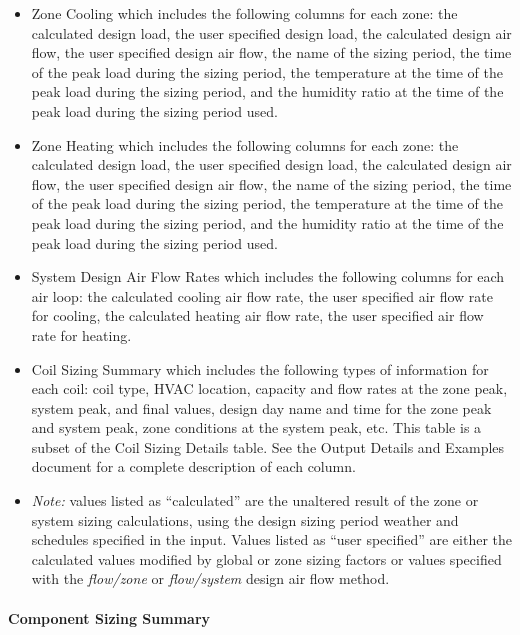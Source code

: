 \begin{itemize}
\item
  Zone Cooling which includes the following columns for each zone: the calculated design load, the user specified design load, the calculated design air flow, the user specified design air flow, the name of the sizing period, the time of the peak load during the sizing period, the temperature at the time of the peak load during the sizing period, and the humidity ratio at the time of the peak load during the sizing period used.
\item
  Zone Heating which includes the following columns for each zone: the calculated design load, the user specified design load, the calculated design air flow, the user specified design air flow, the name of the sizing period, the time of the peak load during the sizing period, the temperature at the time of the peak load during the sizing period, and the humidity ratio at the time of the peak load during the sizing period used.
\item
  System Design Air Flow Rates which includes the following columns for each air loop: the calculated cooling air flow rate, the user specified air flow rate for cooling, the calculated heating air flow rate, the user specified air flow rate for heating.
\item
  Coil Sizing Summary which includes the following types of information for each coil: coil type, HVAC location, capacity and flow rates at the zone peak, system peak, and final values, design day name and time for the zone peak and system peak, zone conditions at the system peak, etc. This table is a subset of the Coil Sizing Details table. See the Output Details and Examples document for a complete description of each column.
\item
  \emph{Note:} values listed as ``calculated'' are the unaltered result of the zone or system sizing calculations, using the design sizing period weather and schedules specified in the input. Values listed as ``user specified'' are either the calculated values modified by global or zone sizing factors or values specified with the \emph{flow/zone} or \emph{flow/system} design air flow method.
\end{itemize}

\paragraph{Component Sizing Summary}\label{component-sizing-summary}

